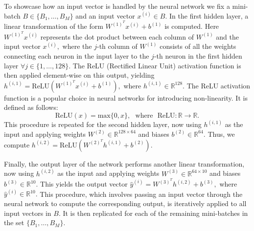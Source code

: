 To showcase how an input vector is handled by the neural network we fix a mini-batch $B\in\{B_{1},\ldots,B_{M}\}$ and an input vector $x^{(i)}\in B.$ In the first hidden layer, a linear transformation of the form $W^{(1)^T}x^{(i)} + b^{(1)}$ is computed. Here $W^{(1)^T}x^{(i)}$ represents the dot product between each column of $W^{(1)}$ and the input vector $x^{(i)},$ where the $j$-th column of $W^{(1)}$ consists of all the weights connecting each neuron in the input layer to the $j$-th neuron in the first hidden layer $\forall j \in \{1,\ldots,128\}$. The ReLU (Rectified Linear Unit) activation function is then applied element-wise on this output, yielding $h^{(i,1)} = \text{ReLU}(W^{(1)^T}x^{(i)} + b^{(1)}),$ where $h^{(i,1)} \in \mathbb{R}^{128}.$ The ReLU activation function is a popular choice in neural networks for introducing non-linearity. It is defined as follows: 
\begin{equation*}\tag{6.4.2.1} 
\text{ReLU}(x) = \text{max}\{0, x\}, \text{ } \text{where} \text{ } \text{ReLU}:\mathbb{R} \rightarrow \mathbb{R}.
\end{equation*}
This procedure is repeated for the second hidden layer, now using $h^{(i,1)}$ as the input and applying weights $W^{(2)} \in \mathbb{R}^{128 \times 64}$ and biases $b^{(2)} \in \mathbb{R}^{64}.$
Thus, we compute $h^{(i,2)} = \text{ReLU}(W^{(2)^T}h^{(i,1)} + b^{(2)}).$

Finally, the output layer of the network performs another linear transformation, now using $h^{(i,2)}$ as the input and applying weights $W^{(3)}\in \mathbb{R}^{64\times10}$ and biases $b^{(3)}\in \mathbb{R}^{10}.$ This yields the output vector $\hat{y}^{(i)} = W^{(3)^T}h^{(i,2)} + b^{(3)},$ where $\hat{y}^{(i)} \in \mathbb{R}^{10}.$ This procedure, which involves passing an input vector through the neural network to compute the corresponding output, is iteratively applied to all input vectors in $B$. It is then replicated for each of the remaining mini-batches in the set $\{B_{1},\ldots,B_{M}\}$. 

